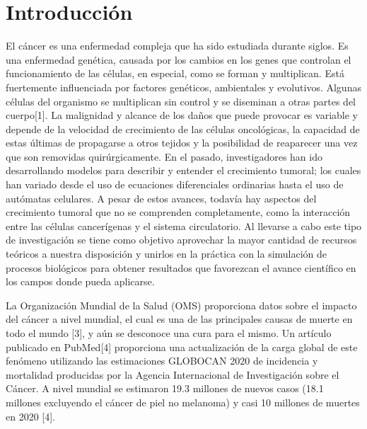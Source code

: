 \chapter*{Introducción}\label{chapter:introduction}

\hspace{.1cm}El cáncer es una enfermedad compleja que ha sido estudiada durante siglos. Es una enfermedad genética, causada por los cambios en los genes que controlan el funcionamiento de las células, en especial, como se forman y multiplican. Está fuertemente influenciada por factores genéticos, ambientales y evolutivos. Algunas células del organismo se multiplican sin control y se diseminan a otras partes del cuerpo[1]. La malignidad y alcance de los daños que puede provocar es variable y depende de la velocidad de crecimiento de las células oncológicas, la capacidad de estas últimas de propagarse a otros tejidos y la posibilidad de reaparecer una vez que son removidas quirúrgicamente. En el pasado, investigadores han ido desarrollando modelos para describir y entender el crecimiento tumoral; los cuales han variado desde el uso de ecuaciones diferenciales ordinarias hasta el uso de autómatas celulares. A pesar de estos avances, todavía hay aspectos del crecimiento tumoral que no se comprenden completamente, como la interacción entre las células cancerígenas y el sistema circulatorio. Al llevarse a cabo este tipo de investigación se tiene como objetivo aprovechar la mayor cantidad de recursos teóricos a nuestra disposición y unirlos en la práctica con la simulación de procesos biológicos para obtener resultados que favorezcan el avance científico en los campos donde pueda aplicarse.

\hspace{.1cm}La Organización Mundial de la Salud (OMS) proporciona datos sobre el impacto del cáncer a nivel mundial, el cual es una de las principales causas de muerte en todo el mundo [3], y aún se desconoce una cura para el mismo. Un artículo publicado en PubMed[4] proporciona una actualización de la carga global de este fen\'omeno utilizando las estimaciones GLOBOCAN 2020 de incidencia y mortalidad producidas por la Agencia Internacional de Investigación sobre el Cáncer. A nivel mundial se estimaron 19.3 millones de nuevos casos (18.1 millones excluyendo el cáncer de piel no melanoma) y casi 10 millones de muertes en 2020 [4].

